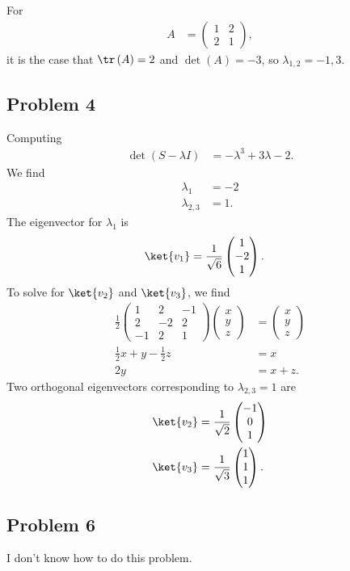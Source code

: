 \documentclass[10pt]{mypackage}
\begin{document}
For
\begin{align*}
  A &= \begin{pmatrix}1 & 2\\ 2 & 1\end{pmatrix},
\end{align*}
it is the case that $\tr\left(A\right) = 2$  and $\det\left(A\right) = -3$, so $\lambda_{1,2} = -1,3$.
\subsection{Problem 4}%
Computing
\begin{align*}
  \det\left(S - \lambda I\right) &= -\lambda^3 + 3\lambda - 2.
\end{align*}
We find
\begin{align*}
  \lambda_{1} &= -2\\
  \lambda_{2,3} &= 1.
\end{align*}
The eigenvector for $\lambda_1$ is
\begin{align*}
  \ket{v_1} &= \frac{1}{\sqrt{6}}\begin{pmatrix}1\\-2\\1\end{pmatrix}.
\end{align*}
To solve for $\ket{v_2}$ and $\ket{v_3}$, we find
\begin{align*}
  \frac{1}{2} \begin{pmatrix}1 & 2 & -1 \\ 2 & -2 & 2 \\ -1 & 2 & 1\end{pmatrix} \begin{pmatrix}x\\y\\z\end{pmatrix} &= \begin{pmatrix}x\\y\\z\end{pmatrix}\\
  \frac{1}{2}x + y -\frac{1}{2}z &= x\\
  2y &= x + z.
\end{align*}
Two orthogonal eigenvectors corresponding to $\lambda_{2,3} = 1$ are
\begin{align*}
  \ket{v_2} &= \frac{1}{\sqrt{2}}\begin{pmatrix}-1\\0\\1\end{pmatrix}\\
  \ket{v_3} &= \frac{1}{\sqrt{3}} \begin{pmatrix}1\\1\\1\end{pmatrix}.
\end{align*}
\subsection{Problem 6}%
I don't know how to do this problem.
\end{document}
